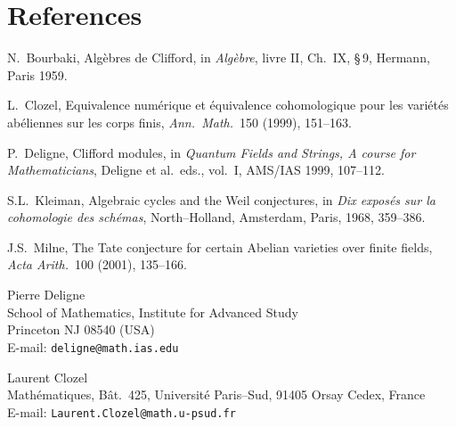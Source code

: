 \documentclass[11pt,a4paper]{article}
\theoremstyle{plain}
\theoremstyle{definition}
\begin{document}
\section*{References}

\begin{enumerate}[label={[\arabic*]}]
\item N.\ Bourbaki, Alg\`ebres de Clifford, in \textit{Alg\`ebre}, livre II, Ch.~IX, \S\,9, Hermann, Paris 1959.
\item L.\ Clozel, Equivalence num\'erique et \'equivalence cohomologique pour les vari\'et\'es ab\'eliennes sur les corps finis, \textit{Ann.\ Math.}\ 150 (1999), 151--163.
\item P.\ Deligne, Clifford modules, in \textit{Quantum Fields and Strings, A course for Mathematicians}, Deligne et al.\ eds., vol.~I, AMS/IAS 1999, 107--112.
\item S.L.\ Kleiman, Algebraic cycles and the Weil conjectures, in \textit{Dix expos\'es sur la cohomologie des sch\'emas}, North--Holland, Amsterdam, Paris, 1968, 359--386.
\item J.S.\ Milne, The Tate conjecture for certain Abelian varieties over finite fields, \textit{Acta Arith.}\ 100 (2001), 135--166.
\end{enumerate}

\vspace{1em}

\noindent
Pierre Deligne\\
School of Mathematics, Institute for Advanced Study\\
Princeton NJ 08540 (USA)\\
E-mail: \texttt{deligne@math.ias.edu}

\vspace{0.5em}

\noindent
Laurent Clozel\\
Math\'ematiques, B\^at.~425, Universit\'e Paris--Sud, 91405 Orsay Cedex, France\\
E-mail: \texttt{Laurent.Clozel@math.u-psud.fr}
\end{document}
